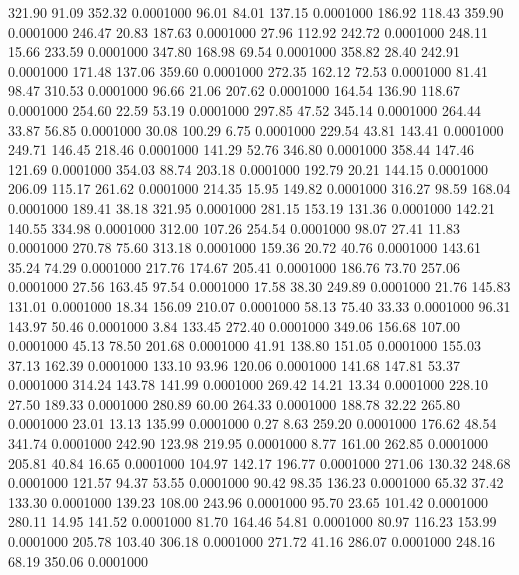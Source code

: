  321.90   91.09  352.32   0.0001000
  96.01   84.01  137.15   0.0001000
 186.92  118.43  359.90   0.0001000
 246.47   20.83  187.63   0.0001000
  27.96  112.92  242.72   0.0001000
 248.11   15.66  233.59   0.0001000
 347.80  168.98   69.54   0.0001000
 358.82   28.40  242.91   0.0001000
 171.48  137.06  359.60   0.0001000
 272.35  162.12   72.53   0.0001000
  81.41   98.47  310.53   0.0001000
  96.66   21.06  207.62   0.0001000
 164.54  136.90  118.67   0.0001000
 254.60   22.59   53.19   0.0001000
 297.85   47.52  345.14   0.0001000
 264.44   33.87   56.85   0.0001000
  30.08  100.29    6.75   0.0001000
 229.54   43.81  143.41   0.0001000
 249.71  146.45  218.46   0.0001000
 141.29   52.76  346.80   0.0001000
 358.44  147.46  121.69   0.0001000
 354.03   88.74  203.18   0.0001000
 192.79   20.21  144.15   0.0001000
 206.09  115.17  261.62   0.0001000
 214.35   15.95  149.82   0.0001000
 316.27   98.59  168.04   0.0001000
 189.41   38.18  321.95   0.0001000
 281.15  153.19  131.36   0.0001000
 142.21  140.55  334.98   0.0001000
 312.00  107.26  254.54   0.0001000
  98.07   27.41   11.83   0.0001000
 270.78   75.60  313.18   0.0001000
 159.36   20.72   40.76   0.0001000
 143.61   35.24   74.29   0.0001000
 217.76  174.67  205.41   0.0001000
 186.76   73.70  257.06   0.0001000
  27.56  163.45   97.54   0.0001000
  17.58   38.30  249.89   0.0001000
  21.76  145.83  131.01   0.0001000
  18.34  156.09  210.07   0.0001000
  58.13   75.40   33.33   0.0001000
  96.31  143.97   50.46   0.0001000
   3.84  133.45  272.40   0.0001000
 349.06  156.68  107.00   0.0001000
  45.13   78.50  201.68   0.0001000
  41.91  138.80  151.05   0.0001000
 155.03   37.13  162.39   0.0001000
 133.10   93.96  120.06   0.0001000
 141.68  147.81   53.37   0.0001000
 314.24  143.78  141.99   0.0001000
 269.42   14.21   13.34   0.0001000
 228.10   27.50  189.33   0.0001000
 280.89   60.00  264.33   0.0001000
 188.78   32.22  265.80   0.0001000
  23.01   13.13  135.99   0.0001000
   0.27    8.63  259.20   0.0001000
 176.62   48.54  341.74   0.0001000
 242.90  123.98  219.95   0.0001000
   8.77  161.00  262.85   0.0001000
 205.81   40.84   16.65   0.0001000
 104.97  142.17  196.77   0.0001000
 271.06  130.32  248.68   0.0001000
 121.57   94.37   53.55   0.0001000
  90.42   98.35  136.23   0.0001000
  65.32   37.42  133.30   0.0001000
 139.23  108.00  243.96   0.0001000
  95.70   23.65  101.42   0.0001000
 280.11   14.95  141.52   0.0001000
  81.70  164.46   54.81   0.0001000
  80.97  116.23  153.99   0.0001000
 205.78  103.40  306.18   0.0001000
 271.72   41.16  286.07   0.0001000
 248.16   68.19  350.06   0.0001000
